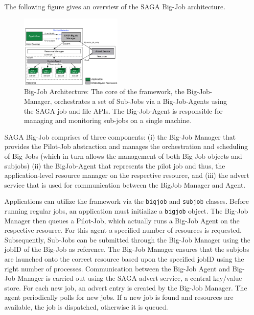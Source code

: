 \documentclass[conference,final]{IEEEtran}
\begin{document}

The following figure gives an overview of the SAGA Big-Job architecture.

\begin{figure}[htbp]
    \centering
    \includegraphics[width=0.45\textwidth]{figures/bigjob}
    \caption{Big-Job Architecture: The core of the framework, the Big-Job-Manager,
     orchestrates a set of Sub-Jobs via a Big-Job-Agents using the SAGA job and file APIs. 
     The Big-Job-Agent is responsible for managing and monitoring sub-jobs on a 
     single machine.}
    \label{fig:figures_bigjob}
\end{figure}

SAGA Big-Job comprises of three components: (i) the Big-Job Manager that provides 
the Pilot-Job abstraction and manages the orchestration and scheduling of 
Big-Jobs (which in turn allows the management of both Big-Job objects and subjobs)
(ii) the BigJob-Agent that represents the pilot job and thus, the application-level 
resource manager on the respective resource, and (iii) the advert service that 
is used for communication between the BigJob Manager and Agent.

Applications can utilize the framework via the \texttt{bigjob} and \texttt{subjob} classes.
Before running regular jobs, an application must initialize a \texttt{bigjob} object. 
The Big-Job Manager then queues a Pilot-Job, which actually runs a Big-Job Agent 
on the respective resource. For this agent a specified number of resources is 
requested. Subsequently, Sub-Jobs can be submitted through the Big-Job Manager 
using the jobID of the Big-Job as reference. The Big-Job Manager ensures that 
the subjobs are launched onto the correct resource based upon the specified 
jobID using the right number of processes. Communication between the Big-Job 
Agent and Big-Job Manager is carried out using the SAGA advert service, a 
central key/value store. For each new job, an advert entry is created by 
the Big-Job Manager. The agent periodically polls for new jobs. If a new 
job is found and resources are available, the job is dispatched, 
otherwise it is queued.
\end{document}
